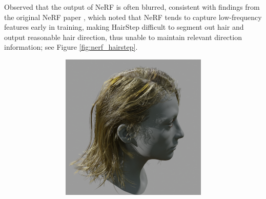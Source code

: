 \documentclass{article}
\begin{document}
Observed that the output of NeRF is often blurred, consistent with findings from the original NeRF paper \cite{mildenhall_nerf_2020}, which noted that NeRF tends to capture low-frequency features early in training, making HairStep difficult to segment out hair and output reasonable hair direction, thus unable to maintain relevant direction information; see Figure \ref{fig:nerf_hairstep}.

\begin{figure}[h]
    \centering
    \begin{subfigure}{0.48\linewidth}
        \centering
        \begin{subfigure}{0.48\textwidth}
            \centering
            \includegraphics[width=\textwidth]{./images/baseline-method/test_6_rendered.png}
        \end{subfigure}
        \hfill
        \begin{subfigure}{0.48\textwidth}
            \centering

\end{subfigure}
\end{subfigure}
\end{figure}
\end{document}
